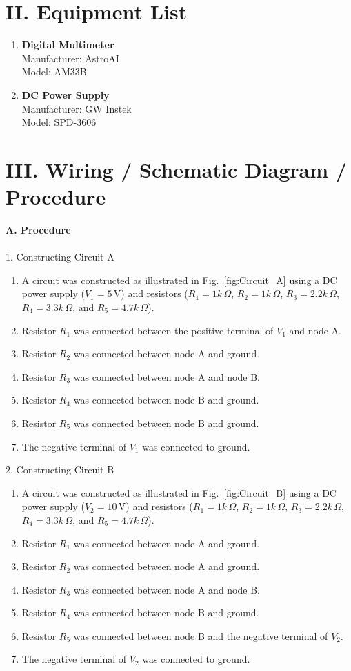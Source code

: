 \documentclass[12pt]{article}
\begin{document}
\newpage
\section*{II. Equipment List}
\begin{enumerate}
    \item \textbf{Digital Multimeter} \\ 
          Manufacturer: AstroAI \\
          Model: AM33B
    \item \textbf{DC Power Supply} \\ 
          Manufacturer: GW Instek \\
          Model: SPD-3606
\end{enumerate}
\newpage
\section*{III. Wiring / Schematic Diagram / Procedure}
\textbf{A. Procedure}\\\\
1. Constructing Circuit A
\begin{enumerate}
    \item A circuit was constructed as illustrated in Fig.~\ref{fig:Circuit_A} using a DC power supply ($V_1 = 5\,\text{V}$) and resistors ($R_1 = 1k\,\Omega$, $R_2 = 1k\,\Omega$, $R_3 = 2.2k\,\Omega$, $R_4 = 3.3k\,\Omega$, and $R_5 = 4.7k\,\Omega$).
    \item Resistor $R_1$ was connected between the positive terminal of $V_1$ and node A.
    \item Resistor $R_2$ was connected between node A and ground.
    \item Resistor $R_3$ was connected between node A and node B.
    \item Resistor $R_4$ was connected between node B and ground.
    \item Resistor $R_5$ was connected between node B and ground.
    \item The negative terminal of $V_1$ was connected to ground.
\end{enumerate}
2. Constructing Circuit B
\begin{enumerate}
    \item A circuit was constructed as illustrated in Fig.~\ref{fig:Circuit_B} using a DC power supply ($V_2 = 10\,\text{V}$) and resistors ($R_1 = 1k\,\Omega$, $R_2 = 1k\,\Omega$, $R_3 = 2.2k\,\Omega$, $R_4 = 3.3k\,\Omega$, and $R_5 = 4.7k\,\Omega$).
    \item Resistor $R_1$ was connected between node A and ground.
    \item Resistor $R_2$ was connected between node A and ground.
    \item Resistor $R_3$ was connected between node A and node B.
    \item Resistor $R_4$ was connected between node B and ground.
    \item Resistor $R_5$ was connected between node B and the negative terminal of $V_2$.
    \item The negative terminal of $V_2$ was connected to ground.
\end{enumerate}
\end{document}
